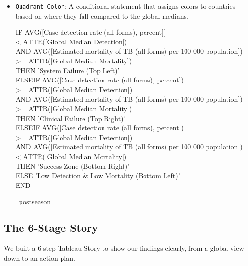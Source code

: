 \documentclass[a4paper,12pt]{extarticle}
\begin{document}
\begin{itemize}
    \item \texttt{Quadrant Color}: A conditional statement that assigns colors to countries based on where they fall compared to the global medians.
    \begin{center}
    \begin{tcolorbox}[colback=white, colframe=lightblue, width=\linewidth, fontupper=\footnotesize\ttfamily, arc=3pt]
    IF AVG([Case detection rate (all forms), percent]) \\
    \hspace*{1em} < ATTR([Global Median Detection]) \\
    AND AVG([Estimated mortality of TB (all forms) per 100 000 population]) \\
    \hspace*{1em} >= ATTR([Global Median Mortality]) \\
    THEN 'System Failure (Top Left)' \\[0.2cm]
    ELSEIF AVG([Case detection rate (all forms), percent]) \\
    \hspace*{1em} >= ATTR([Global Median Detection]) \\
    AND AVG([Estimated mortality of TB (all forms) per 100 000 population]) \\
    \hspace*{1em} >= ATTR([Global Median Mortality]) \\
    THEN 'Clinical Failure (Top Right)' \\[0.2cm]
    ELSEIF AVG([Case detection rate (all forms), percent]) \\
    \hspace*{1em} >= ATTR([Global Median Detection]) \\
    AND AVG([Estimated mortality of TB (all forms) per 100 000 population]) \\
    \hspace*{1em} < ATTR([Global Median Mortality]) \\
    THEN 'Success Zone (Bottom Right)' \\[0.2cm]
    ELSE 'Low Detection \& Low Mortality (Bottom Left)' \\
    END
    \end{tcolorbox}
    \end{center}
\ postseason
\end{itemize}

\subsection{The 6-Stage Story}
We built a 6-step Tableau Story to show our findings clearly, from a global view down to an action plan.
\end{document}
